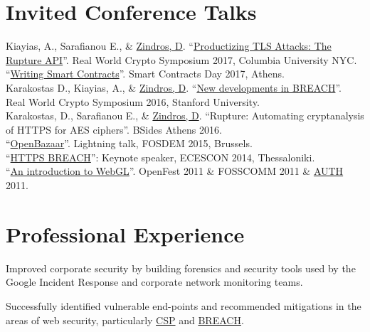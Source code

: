 \documentclass[]{deedy-resume-openfont}
\begin{document}
\begin{minipage}[t]{0.66\textwidth}
\section{Invited Conference Talks}
Kiayias, A., Sarafianou E., \& \underline{Zindros, D}.
``\href{https://rwc.iacr.org/2017/Slides/eva.sarafianou.pdf}{Productizing TLS
Attacks: The Rupture API}''.
Real World Crypto Symposium 2017,
Columbia University NYC.\\
``\href{https://www.youtube.com/watch?v=IbKgeN3bd80}{Writing Smart Contracts}''. Smart Contracts Day 2017, Athens.\\
Karakostas D., Kiayias, A., \& \underline{Zindros, D}.
``\href{https://rwc.iacr.org/2016/Slides/New\%20developments\%20on\%20BREACH.pdf}{New developments in BREACH}''.
Real World Crypto Symposium 2016,
Stanford University.\\
Karakostas, D., Sarafianou E., \& \underline{Zindros, D}.
``Rupture: Automating cryptanalysis of HTTPS for AES ciphers''.
BSides Athens 2016.\\
``\href{http://mirror.as35701.net/video.fosdem.org//2015/lightning_talks/openbazaar.mp4}{OpenBazaar}''.
Lightning talk,
FOSDEM 2015,
Brussels.\\
``\href{https://www.youtube.com/watch?v=0UfxGgoSaHc}{HTTPS BREACH}'': Keynote speaker, ECESCON 2014, Thessaloniki.\\
``\href{https://github.com/dionyziz/webgl-seminar}{An introduction to WebGL}''. OpenFest 2011 \& FOSSCOMM 2011
\& \href{http://webseminars.ee.auth.gr/#lectures}{AUTH} 2011.
\sectionsep

\section{Professional Experience}

Improved corporate security by building forensics and security tools used by the Google Incident Response and corporate network monitoring teams.
\sectionsep

Successfully identified vulnerable end-points and recommended mitigations in the areas of web security, particularly \href{https://developer.mozilla.org/en-US/docs/Security/CSP}{CSP} and \href{http://breachattack.com/}{BREACH}.
\sectionsep


\end{minipage}
\end{document}
